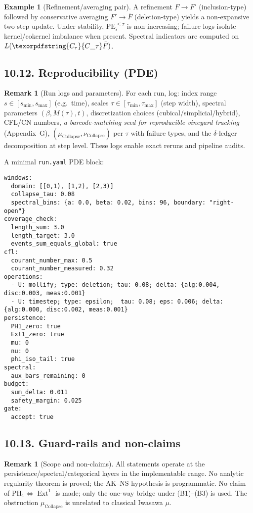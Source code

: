 \documentclass[11pt]{article}
\DeclareMathOperator{\Ext}{Ext}
\DeclareRobustCommand{\hyp}{\nobreakdash-}
\numberwithin{equation}{section}
\theoremstyle{definition}
\newtheorem{example}[theorem]{Example}
\newtheorem{remark}[theorem]{Remark}
\DeclareRobustCommand{\Ctau}{\texorpdfstring{\ensuremath{C_{\tau}}}{C\_\tau}}
\DeclareRobustCommand{\muc}{\mu_{\mathrm{Collapse}}}
\DeclareRobustCommand{\nuc}{\nu_{\mathrm{Collapse}}}
\begin{document}
\begin{example}[Refinement/averaging pair]
A refinement \(F\to F'\) (inclusion\hyp type) followed by conservative averaging \(F'\to \bar{F}\) (deletion\hyp type) yields a non\hyp expansive two\hyp step update.
Under stability, \(\mathrm{PE}_i^{\le \tau}\) is non\hyp increasing; failure logs isolate kernel/cokernel imbalance when present.
Spectral indicators are computed on \(L(\Ctau \bar{F})\).
\end{example}

\subsection*{10.12. Reproducibility (PDE)}
\begin{remark}[Run logs and parameters]\label{rk:10-logs}
For each run, log: index range \(s\in[s_{\min},s_{\max}]\) (e.g.\ time), scales \(\tau\in[\tau_{\min},\tau_{\max}]\) (step width), spectral parameters \((\beta,M(\tau),t)\), discretization choices (cubical/simplicial/hybrid), CFL/CN numbers, \emph{a barcode\hyp matching seed for reproducible vineyard tracking} (Appendix~G), \((\muc,\nuc)\) per \(\tau\) with failure types, and the \(\delta\)\hyp ledger decomposition at step level.
These logs enable exact reruns and pipeline audits.
\end{remark}

\noindent A minimal \texttt{run.yaml} PDE block:

\begin{verbatim}
windows:
  domain: [[0,1), [1,2), [2,3)]
  collapse_tau: 0.08
  spectral_bins: {a: 0.0, beta: 0.02, bins: 96, boundary: "right-open"}
coverage_check:
  length_sum: 3.0
  length_target: 3.0
  events_sum_equals_global: true
cfl:
  courant_number_max: 0.5
  courant_number_measured: 0.32
operations:
  - U: mollify; type: deletion; tau: 0.08; delta: {alg:0.004, disc:0.003, meas:0.001}
  - U: timestep; type: epsilon;  tau: 0.08; eps: 0.006; delta: {alg:0.000, disc:0.002, meas:0.001}
persistence:
  PH1_zero: true
  Ext1_zero: true
  mu: 0
  nu: 0
  phi_iso_tail: true
spectral:
  aux_bars_remaining: 0
budget:
  sum_delta: 0.011
  safety_margin: 0.025
gate:
  accept: true
\end{verbatim}

\subsection*{10.13. Guard\hyp rails and non\hyp claims}
\begin{remark}[Scope and non\hyp claims]\label{rk:10-guard}
All statements operate at the persistence/spectral/categorical layers in the implementable range.
No analytic regularity theorem is proved; the AK–NS hypothesis is programmatic.
No claim of \(\mathrm{PH}_1\Leftrightarrow\Ext^1\) is made; only the one\hyp way bridge under (B1)–(B3) is used.
The obstruction \(\muc\) is unrelated to classical Iwasawa \(\mu\).
\end{remark}
\end{document}
